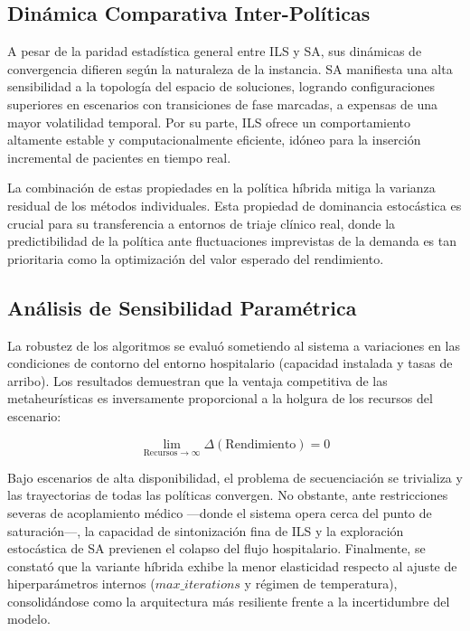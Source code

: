 \documentclass[12pt,a4paper]{article}
\begin{document}
\subsection{Dinámica Comparativa Inter-Políticas}

A pesar de la paridad estadística general entre ILS y SA, 
sus dinámicas de convergencia difieren según la naturaleza de la instancia. 
SA manifiesta una alta sensibilidad a la topología del espacio de soluciones, 
logrando configuraciones superiores en escenarios con transiciones de fase marcadas, 
a expensas de una mayor volatilidad temporal. Por su parte, ILS ofrece un comportamiento altamente estable y 
computacionalmente eficiente, idóneo para la inserción incremental de pacientes en tiempo real. 

La combinación de estas propiedades en la política híbrida mitiga la varianza residual de los métodos individuales. 
Esta propiedad de dominancia estocástica es crucial para su transferencia a entornos de triaje clínico real, 
donde la predictibilidad de la política ante fluctuaciones imprevistas de la demanda es tan prioritaria como la 
optimización del valor esperado del rendimiento.

\subsection{Análisis de Sensibilidad Paramétrica}

La robustez de los algoritmos se evaluó sometiendo al sistema a variaciones en las condiciones de contorno 
del entorno hospitalario (capacidad instalada y tasas de arribo). Los resultados demuestran que la ventaja 
competitiva de las metaheurísticas es inversamente proporcional a la holgura de los recursos del escenario:

\begin{equation}
\lim_{\text{Recursos} \to \infty} \Delta(\text{Rendimiento}) = 0
\end{equation}

Bajo escenarios de alta disponibilidad, el problema de secuenciación se trivializa y las trayectorias de todas 
las políticas convergen. 
No obstante, ante restricciones severas de acoplamiento médico —donde el sistema opera cerca del punto de saturación—, 
la capacidad de sintonización fina de ILS y la exploración estocástica de SA previenen el colapso del flujo hospitalario. 
Finalmente, se constató que la variante híbrida exhibe la menor elasticidad respecto al ajuste de hiperparámetros internos 
($max\_iterations$ y régimen de temperatura), 
consolidándose como la arquitectura más resiliente frente a la incertidumbre del modelo.
\end{document}
